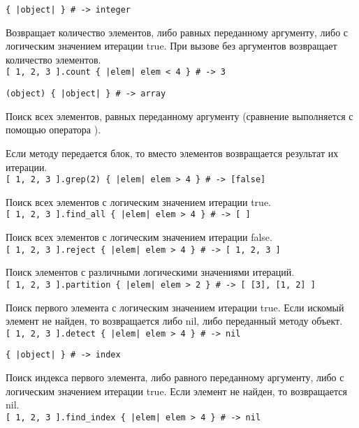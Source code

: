 \begin{methodlist}
  \verb!{ |object| } # -> integer!

  Возвращает количество элементов, либо равных переданному аргументу, либо с логическим значением итерации true. При вызове без аргументов возвращает количество элементов. 
  \\\verb![ 1, 2, 3 ].count { |elem| elem < 4 } # -> 3!

  \verb!(object) { |object| } # -> array!

  Поиск всех элементов, равных переданному аргументу (сравнение выполняется с помощью оператора \method{===}).

  Если методу передается блок, то вместо элементов возвращается результат их итерации.
  \\\verb![ 1, 2, 3 ].grep(2) { |elem| elem > 4 } # -> [false]!

  Поиск всех элементов с логическим значением итерации true. 
  \\\verb![ 1, 2, 3 ].find_all { |elem| elem > 4 } # -> [ ]!

  Поиск всех элементов с логическим значением итерации false. 
  \\\verb![ 1, 2, 3 ].reject { |elem| elem > 4 } # -> [ 1, 2, 3 ]!

  Поиск элементов с различными логическими значениями итераций. 
  \\\verb![ 1, 2, 3 ].partition { |elem| elem > 2 } # -> [ [3], [1, 2] ]!

  Поиск первого элемента с логическим значением итерации true. Если искомый элемент не найден, то возвращается либо nil, либо переданный методу объект.
  \\\verb![ 1, 2, 3 ].detect { |elem| elem > 4 } # -> nil!

  \verb!{ |object| } # -> index!

  Поиск индекса первого элемента, либо равного переданному аргументу, либо с логическим значением итерации true. Если элемент не найден, то возвращается nil. 
  \\\verb![ 1, 2, 3 ].find_index { |elem| elem > 4 } # -> nil!
\end{methodlist}


